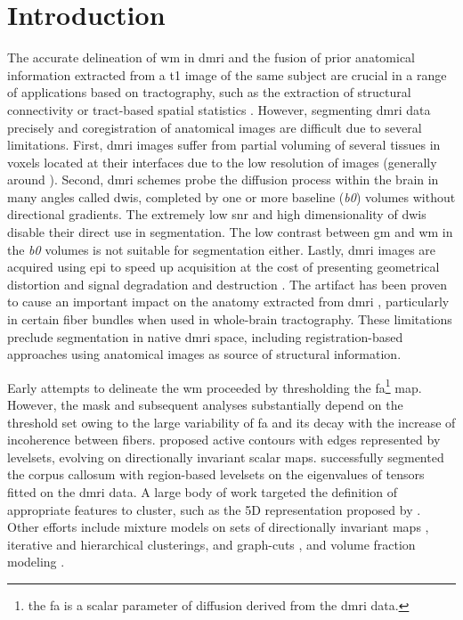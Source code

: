 \section{Introduction}\label{sec:introduction}
The accurate delineation of \gls*{wm} in \gls*{dmri} and the fusion of prior
  anatomical information extracted from a \gls*{t1} image of the same subject
  are crucial in a range of applications based on tractography, such as
  the extraction of structural connectivity \citep{craddock_imaging_2013} or
  tract-based spatial statistics \citep{smith_tractbased_2006}.
However, segmenting \gls*{dmri} data precisely and coregistration of anatomical
  images are difficult due to several limitations.
First, \gls{dmri} images suffer from partial voluming of several tissues in 
  voxels located at their interfaces due to the low resolution of images
  (generally around ).
Second, \gls*{dmri} schemes probe the diffusion process within the brain in 
  many angles called \glspl*{dwi}, completed by one or more baseline (\emph{b0}) 
  volumes without directional gradients.
The extremely low \gls*{snr} and high dimensionality of \glspl*{dwi} disable their
  direct use in segmentation.
The low contrast between \gls*{gm} and \gls*{wm} in the \emph{b0} volumes is not suitable for 
  segmentation either.
Lastly, \gls*{dmri} images are acquired using \gls*{epi} to speed up acquisition
  at the cost of presenting geometrical distortion and signal degradation and
  destruction \citep{jezzard_correction_1995}.
The artifact has been proven to cause an important impact on the anatomy extracted
  from \gls*{dmri} \citep{irfanoglu_effects_2012}, particularly in certain fiber bundles
  when used in whole-brain tractography.
These limitations preclude segmentation in native \gls*{dmri} space, including
  registration-based approaches using anatomical images as source of structural
  information.


Early attempts to delineate the \gls*{wm} proceeded by thresholding the 
  \gls*{fa}\footnote{the \gls*{fa} is a scalar parameter of diffusion derived from
  the \gls*{dmri} data.} map.
However, the mask and subsequent analyses substantially depend on the threshold set
  \citep{taoka_fractional_2009} owing to the large variability of \gls*{fa} and its
  decay with the increase of incoherence between fibers.
\cite{zhukov_level_2003} proposed active contours with edges represented
  by levelsets, evolving on directionally invariant scalar maps.
\cite{rousson_level_2004} successfully segmented the corpus callosum with
  region-based levelsets on the eigenvalues of tensors fitted on the
  \gls*{dmri} data.
A large body of work targeted the definition of appropriate features to cluster,
  such as the 5D representation proposed by \cite{jonasson_segmentation_2005}.
Other efforts include mixture models on sets of directionally invariant maps
  \citep{liu_brain_2007}, iterative \citep{hadjiprocopis_unbiased_2005} and
  hierarchical \citep{lu_segmentation_2008} clusterings,
  and graph-cuts \citep{han_experimental_2009},
  and volume fraction modeling \citep{kumazawa_improvement_2013}.
 
